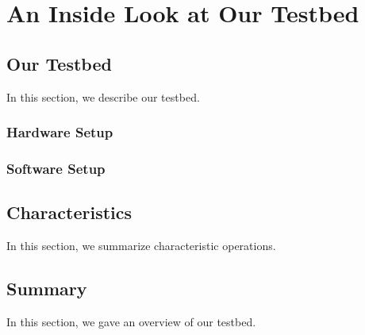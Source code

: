 \chapter{An Inside Look at Our Testbed}
\label{chap:testbed}



\section{Our Testbed}
\label{sec:testbed}

In this section, we describe our testbed.

\subsection{Hardware Setup}
\label{sec:testbed:hardware}



\subsection{Software Setup}
\label{sec:testbed:software}
%


\section{Characteristics}
\label{sec:characteristics}

In this section, we summarize characteristic operations.
%

\section{Summary}
\label{sec:conclusion}

In this section, we gave an overview of our testbed.
%